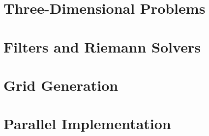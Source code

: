 \documentclass[12pt]{book}
\begin{document}




\part{Three-Dimensional Problems}

\part{Filters and Riemann Solvers}



\part{Grid Generation}

\part{Parallel Implementation}



\end{document}
